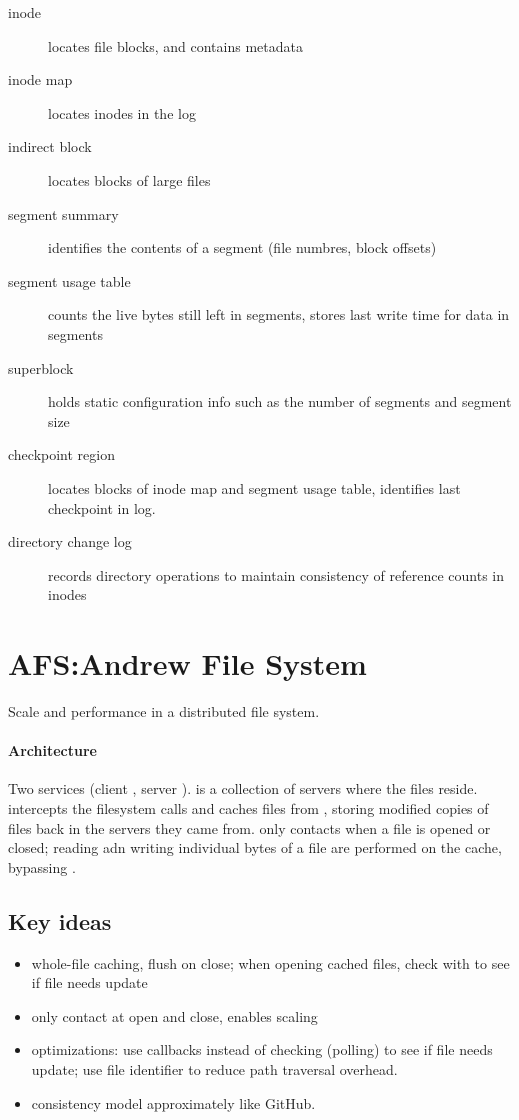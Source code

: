 \documentclass{article}
\begin{document}
\begin{description}
\item[inode] locates file blocks, and contains metadata
\item[inode map] locates inodes in the log
\item[indirect block] locates blocks of large files
\item[segment summary] identifies the contents of a segment (file
  numbres, block offsets)
\item[segment usage table] counts the live bytes still left in
  segments, stores last write time for data in segments
\item[superblock] holds static configuration info such as the number
  of segments and segment size
\item[checkpoint region] locates blocks of inode map and segment usage
  table, identifies last checkpoint in log. 
\item[directory change log] records directory operations to maintain
  consistency of reference counts in inodes
\end{description}

\section{AFS:\@ Andrew File System}
Scale and performance in a distributed file system.

\paragraph{Architecture}
Two services (client , server ).  is
a collection of servers where the files reside. 
intercepts the filesystem calls and caches files from ,
storing modified copies of files back in the servers they came
from.  only contacts  when a file is opened or
closed; reading adn writing individual bytes of a file are performed
on the cache, bypassing .

\subsection*{Key ideas}
\begin{itemize}
\item whole-file caching, flush on close; when opening cached files,
  check with  to see if file needs update
\item only contact  at open and close, enables scaling
\item optimizations: use callbacks instead of checking (polling) to
  see if file needs update; use file identifier to reduce path
  traversal overhead.
\item consistency model approximately like GitHub.
\end{itemize}
\end{document}
